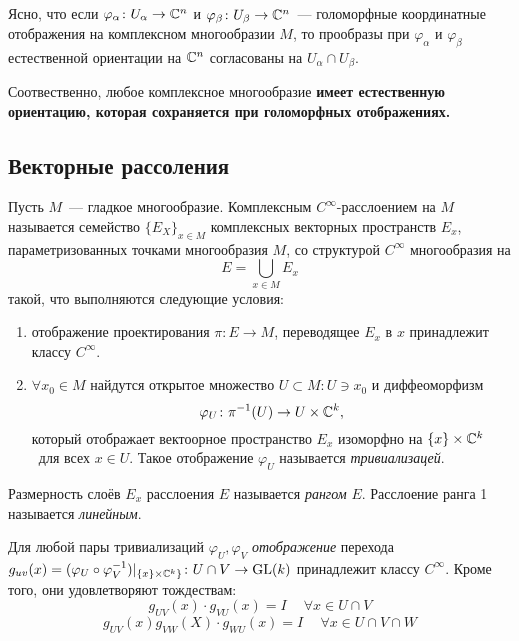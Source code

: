     Ясно, что если $\varphi_{\alpha}\colon U_{\alpha} \to \mathbb{C}^n$ и $\varphi_{\beta}\colon U_{\beta} \to \mathbb{C}^n$~--- голоморфные координатные отображения на
    комплексном многообразии $M$, то прообразы при $\varphi_{\alpha}$ и $\varphi_{\beta}$
    естественной ориентации на  $\mathbb{C}^n$ согласованы на $U_{\alpha} \cap U_{\beta}$.

    Соотвественно, любое комплексное многообразие \bf{имеет естественную ориентацию}, которая сохраняется
    при голоморфных отображениях.

    \subsection{Векторные рассоления}

    \begin{definition} 
        Пусть $M$~--- гладкое многообразие. Комплексным $C^{\infty}$-расслоением на $M$
    называется семейство $\{ E_{X} \}_{x \in M}$ комплексных векторных пространств $E_{x}$, параметризованных точками многообразия $M$,
    со структурой $C^{\infty}$ многообразия на 
    \[
        E = \bigcup_{x \in M} E_{x}
    \]
    такой, что выполняются следующие условия: 
    \begin{enumerate}
        \item отображение проектирования $\pi\colon E \to M$, переводящее $E_x$ в $x$ принадлежит классу $C^{\infty}$.
        \item $\forall x_0 \in M$ найдутся открытое множество $U \subset M\colon U \ni x_0$  и диффеоморфизм 
        \[
            \varphi_{U}\colon \pi^{-1}(U) \to U \times \mathbb{C}^k,
        \]
        который отображает вектоорное пространство $E_x$ изоморфно на $\{ x \} \times \mathbb{C}^k$  для всех $x \in U$.
        Такое отображение $\varphi_{U}$ называется \emph{тривиализацей}. 
    \end{enumerate}
    
    Размерность слоёв $E_{x}$ расслоения $E$ называется \emph{рангом} $E$. Расслоение ранга 1 называется \emph{линейным}.
    \end{definition}

    \begin{remark}
        Для любой пары тривиализаций $\varphi_{U}, \varphi_{V}$ \emph{отображение} перехода $g_{uv}(x) = (\varphi_{U} \circ \varphi_{V}^{-1})\vert_{\{ x \} \times \mathbb{C}^k \}}\colon U \cap V \to \mathrm{GL}(k)$ принадлежит классу $C^{\infty}$. Кроме того, они удовлетворяют тождествам: 
        \[
            g_{UV}(x) \cdot g_{VU}(x) = I \quad \ \forall x \in U \cap V 
        \]
        \[
            g_{UV}(x) g_{VW}(X) \cdot g_{WU}(x) = I \quad \ \forall x \in U \cap V \cap W 
        \]
    \end{remark}

